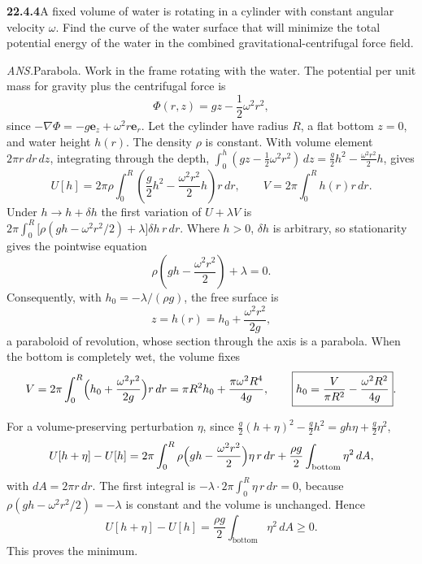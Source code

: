 \par\bigskip
\noindent\textbf{22.4.4}\quad A fixed volume of water is rotating
in a cylinder with constant angular velocity $\omega$. Find the
curve of the water surface that will minimize the total
potential energy of the water in the combined
gravitational-centrifugal force field.
\par\nobreak\hfill\emph{ANS.}\enspace Parabola.
\solution
{}
Work in the frame rotating with the water.  The potential per unit
mass for gravity plus the centrifugal force is
\[
 \Phi(r,z)=gz-\frac12\omega^2r^2,
\]
since $-\nabla\Phi=-g\mathbf e_z+\omega^2r\mathbf e_r$.
Let the cylinder have radius $R$, a flat bottom $z=0$, and water
height $h(r)$.  The density $\rho$ is constant.  With volume element
$2\pi r\,dr\,dz$, integrating through the depth,
$\int_0^h(gz-\frac12\omega^2r^2)\,dz=\frac g2h^2-\frac{\omega^2r^2}{2}h$,
gives
\[
 U[h]=2\pi\rho\int_0^R
       \left(\frac g2h^2-\frac{\omega^2r^2}{2}h\right)r\,dr,
 \qquad
 V=2\pi\int_0^R h(r)r\,dr.
\]
Under $h\to h+\delta h$ the first variation of $U+\lambda V$ is
$2\pi\int_0^R\bigl[\rho(gh-\omega^2r^2/2)+\lambda\bigr]\delta h\,r\,dr$.
Where $h>0$, $\delta h$ is arbitrary, so stationarity gives the
pointwise equation
\[
 \rho\left(gh-\frac{\omega^2r^2}{2}\right)+\lambda=0.
\]
Consequently, with $h_0=-\lambda/(\rho g)$, the free surface is
\[
 \boxed{z=h(r)=h_0+\frac{\omega^2r^2}{2g}},
\]
a paraboloid of revolution, whose section through the axis is a
parabola.  When the bottom is completely wet, the volume fixes
\[
 V=2\pi\int_0^R\Bigl(h_0+\frac{\omega^2r^2}{2g}\Bigr)r\,dr
 =\pi R^2h_0+\frac{\pi\omega^2R^4}{4g},\qquad
 \boxed{h_0=\frac{V}{\pi R^2}-\frac{\omega^2R^2}{4g}}.
\]

For a volume-preserving perturbation $\eta$, since
$\frac g2(h+\eta)^2-\frac g2h^2=gh\eta+\frac g2\eta^2$,
\[
 U[h+\eta]-U[h]
 =2\pi\int_0^R\rho\Bigl(gh-\frac{\omega^2r^2}{2}\Bigr)\eta\,r\,dr
 +\frac{\rho g}{2}\int_{\text{bottom}}\eta^2\,dA,
\]
with $dA=2\pi r\,dr$. The first integral is
$-\lambda\cdot2\pi\int_0^R\eta\,r\,dr=0$, because
$\rho(gh-\omega^2r^2/2)=-\lambda$ is constant and the volume is
unchanged. Hence
\[
 U[h+\eta]-U[h]=\frac{\rho g}{2}\int_{\text{bottom}}\eta^2\,dA\ge0.
\]
This proves the minimum.

